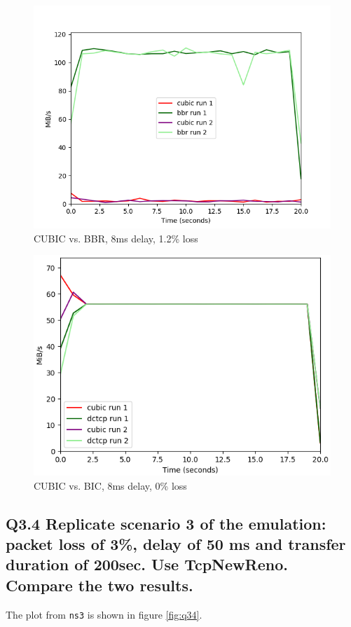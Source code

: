 \documentclass{article}
\begin{document}
\begin{figure}[H]
	\includegraphics{lab1-group1-task3-question3-2.png}
	\caption{CUBIC vs. BBR, 8ms delay, 1.2\% loss}
	\label{fig:cubic-bbr-8-12}
\end{figure}

\begin{figure}[H]
	\includegraphics[width=\textwidth]{lab1-group1-task3-question3-3.png}
	\caption{CUBIC vs. BIC, 8ms delay, 0\% loss}
	\label{fig:cubic-bic-8-0}
\end{figure}


\subsection{Q3.4 Replicate scenario 3 of the emulation: packet loss of 3\%, delay of 50 ms and transfer duration of 200sec. Use TcpNewReno. Compare the two results.}
The plot from \texttt{ns3} is shown in figure \ref{fig:q34}.
\end{document}
